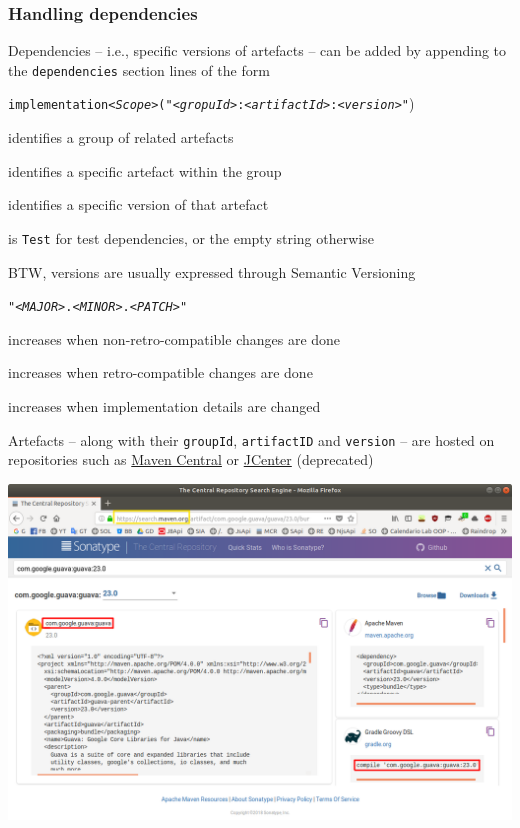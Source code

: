 \documentclass[presentation]{beamer}\mode<presentation>{\usetheme{AMSBolognaFC}}
\begin{document}
\begin{frame}[allowframebreaks]
    \frametitle{Handling dependencies}

    Dependencies -- i.e., specific versions of artefacts -- can be added by appending to the \texttt{dependencies} section lines of the form
    \begin{center}
        \texttt{implementation\textit{<Scope>}("\textit{<gropuId>}\alert{:}\textit{<artifactId>}\alert{:}\textit{<version>"}})
    \end{center}
    \begin{description}\small
        \item[\texttt{gropuId}] identifies a group of related artefacts
        \item[\texttt{artifactId}] identifies a specific artefact within the group
        \item[\texttt{version}] identifies a specific version of that artefact
        \item[\texttt{Scope}] is \alert{\texttt{Test}} for test dependencies, or the empty string otherwise
    \end{description}

    \medskip

    BTW, versions are usually expressed through Semantic Versioning 
    \begin{center}
        \texttt{"\textit{<MAJOR>}\alert{.}\textit{<MINOR>}\alert{.}\textit{<PATCH>"}}
    \end{center}
    \begin{description}\small
        \item[\texttt{MAJOR}] increases when non-retro-compatible changes are done
        \item[\texttt{MINOR}] increases when retro-compatible changes are done
        \item[\texttt{PATCH}] increases when implementation details are changed
    \end{description}

    \framebreak

    Artefacts -- along with their \texttt{groupId}, \texttt{artifactID} and \texttt{version} -- are hosted on repositories such as \href{https://search.maven.org/}{Maven Central} or \href{https://bintray.com/bintray/jcenter}{JCenter} (deprecated)
    \begin{center}
        \includegraphics[width=.6\linewidth]{./img/mcr.png}


\end{center}
\end{frame}
\end{document}
